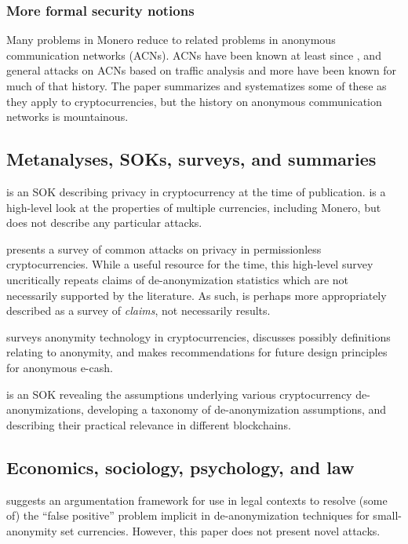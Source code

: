 \documentclass{article}
\theoremstyle{definition}
\begin{document}
\subsubsection{More formal security notions}

Many problems in Monero reduce to related problems in anonymous communication networks (ACNs).
ACNs have been known at least since \cite{chaum1981untraceable}, and general attacks on ACNs based on traffic analysis and more have been known for much of that history.
The paper \cite{kuhn2018privacy} summarizes and systematizes some of these as they apply to cryptocurrencies, but the history on anonymous communication networks is mountainous.


\subsection{Metanalyses, SOKs, surveys, and summaries}

\cite{alsalami2019sok} is an SOK describing privacy in cryptocurrency at the time of publication.
\cite{khan2019look} is a high-level look at the properties of multiple currencies, including Monero, but does not describe any particular attacks.

\cite{junejo2020survey} presents a survey of common attacks on privacy in permissionless cryptocurrencies.
While a useful resource for the time, this high-level survey uncritically repeats claims of de-anonymization statistics which are not necessarily supported by the literature.
As such, \cite{junejo2020survey} is perhaps more appropriately described as a survey of \textit{claims}, not necessarily results.

\cite{andola2021anonymity} surveys anonymity technology in cryptocurrencies, discusses possibly definitions relating to anonymity, and makes recommendations for future design principles for anonymous e-cash.

\cite{deuber2022sok} is an SOK revealing the assumptions underlying various cryptocurrency de-anonymizations, developing a taxonomy of de-anonymization assumptions, and describing their practical relevance in different blockchains.


\subsection{Economics, sociology, psychology, and law}

\cite{deuber2024argumentation} suggests an argumentation framework for use in legal contexts to resolve (some of) the ``false positive'' problem implicit in de-anonymization techniques for small-anonymity set currencies.
However, this paper does not present novel attacks.
\end{document}
